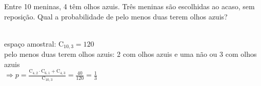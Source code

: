 \begin{ex}
 Entre 10 meninas, 4 têm olhos azuis. Três meninas são escolhidas ao acaso, sem reposição. Qual a probabilidade de pelo menos duas terem olhos azuis?
   \begin{sol}
      \phantom{A}  \\
     espaço amostral: $\mathrm{C}_{{10},3}=120$\\
     pelo menos duas terem olhos azuis:  2 com  olhos azuis e uma não ou 3 com olhos azuis\\ $\Longrightarrow p=\frac{\mathrm{C}_{4,2}\cdot\mathrm{C}_{6,1}+\mathrm{C}_{4,3}}{\mathrm{C}_{{10},3}}=\frac{40}{120}=\frac{1}{3}$
     
   \end{sol}
\end{ex}